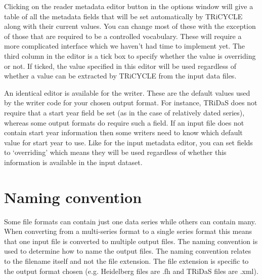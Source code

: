 \documentclass[10pt, headsepline,DIV14,BCOR0.5cm]{scrreprt}
\begin{document}
Clicking on the reader metadata editor button in the options window will give a table of all the metadata
fields that will be set automatically by TRiCYCLE along with their current values. You can change most
of these with the exception of those that are required to be a controlled vocabulary. These will require a 
more complicated interface which we haven't had time to implement yet. The third column in the editor is
a tick box to specify whether the value is overriding or not. If ticked, the value specified in this editor will
be used regardless of whether a value can be extracted by TRiCYCLE from the input data files.

An identical editor is available for the writer. These are the default values used by the writer code for
your chosen output format. For instance, TRiDaS does not require that a start year field be set (as in the
case of relatively dated series), whereas some output formats do require such a field. If an input file does
not contain start year information then some writers need to know which default value for start year to
use. Like for the input metadata editor, you can set fields to `overriding' which means they will be used
regardless of whether this information is available in the input dataset.

\section{Naming convention}

Some file formats can contain just one data series while others can contain many. When converting from
a multi-series format to a single series format this means that one input file is converted to multiple output
files. The naming convention is used to determine how to name the output files. The naming convention
relates to the filename itself and not the file extension. The file extension is specific to the output format
chosen (e.g. Heidelberg files are .fh and TRiDaS files are .xml).
\end{document}

